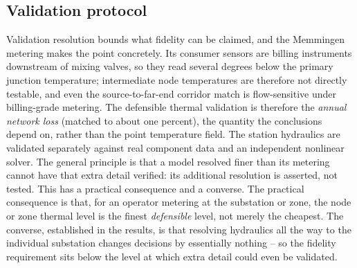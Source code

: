 \documentclass[a4paper,fleqn]{cas-dc}
\begin{document}
\subsection{Validation protocol}

Validation resolution bounds what fidelity can be claimed, and the Memmingen metering makes the
point concretely. Its consumer sensors are billing instruments downstream of mixing valves, so
they read several degrees below the primary junction temperature; intermediate node temperatures
are therefore not directly testable, and even the source-to-far-end corridor match is
flow-sensitive under billing-grade metering. The defensible thermal validation is therefore the
\emph{annual network loss} (matched to about one percent), the quantity the conclusions depend
on, rather than the point temperature field. The station hydraulics are validated separately against real component data and an
independent nonlinear solver. The general principle is that a model resolved finer than its
metering cannot have that extra detail verified: its additional resolution is asserted, not
tested. This has a practical
consequence and a converse. The practical consequence is that, for an operator metering at the
substation or zone, the node or zone thermal level is the finest \emph{defensible} level, not
merely the cheapest. The converse, established in the results, is that resolving hydraulics all
the way to the individual substation changes decisions by essentially nothing -- so the
fidelity requirement sits below the level at which extra detail could even be validated.
\end{document}
